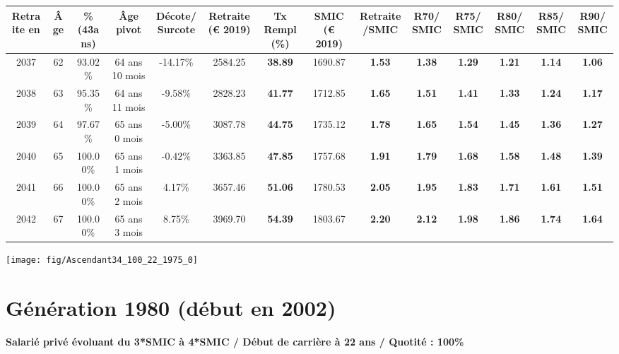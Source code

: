 \begin{adjustbox}{max width=\textwidth} 
\begin{tabular}[htb]{|c|c||c|c|c||c|c||c|c||c|c|c|c|c|} 
\hline 
 Retraite en &  Âge &  \%(43ans) &  Âge pivot &  Décote/Surcote &  Retraite (\euro{} 2019) &  Tx Rempl(\%) &  SMIC (\euro{} 2019) &  Retraite/SMIC &  R70/SMIC &  R75/SMIC &  R80/SMIC &  R85/SMIC &  R90/SMIC \\ 
\hline \hline 
 2037 &  62 &  93.02\% &  64 ans 10 mois &  -14.17\% &  2584.25 &  {\bf 38.89} &  1690.87 &  {\bf 1.53} &  {\bf 1.38} &  {\bf 1.29} &  {\bf 1.21} &  {\bf 1.14} &  {\bf 1.06} \\ 
\hline 
 2038 &  63 &  95.35\% &  64 ans 11 mois &  -9.58\% &  2828.23 &  {\bf 41.77} &  1712.85 &  {\bf 1.65} &  {\bf 1.51} &  {\bf 1.41} &  {\bf 1.33} &  {\bf 1.24} &  {\bf 1.17} \\ 
\hline 
 2039 &  64 &  97.67\% &  65 ans 0 mois &  -5.00\% &  3087.78 &  {\bf 44.75} &  1735.12 &  {\bf 1.78} &  {\bf 1.65} &  {\bf 1.54} &  {\bf 1.45} &  {\bf 1.36} &  {\bf 1.27} \\ 
\hline 
 2040 &  65 &  100.00\% &  65 ans 1 mois &  -0.42\% &  3363.85 &  {\bf 47.85} &  1757.68 &  {\bf 1.91} &  {\bf 1.79} &  {\bf 1.68} &  {\bf 1.58} &  {\bf 1.48} &  {\bf 1.39} \\ 
\hline 
 2041 &  66 &  100.00\% &  65 ans 2 mois &  4.17\% &  3657.46 &  {\bf 51.06} &  1780.53 &  {\bf 2.05} &  {\bf 1.95} &  {\bf 1.83} &  {\bf 1.71} &  {\bf 1.61} &  {\bf 1.51} \\ 
\hline 
 2042 &  67 &  100.00\% &  65 ans 3 mois &  8.75\% &  3969.70 &  {\bf 54.39} &  1803.67 &  {\bf 2.20} &  {\bf 2.12} &  {\bf 1.98} &  {\bf 1.86} &  {\bf 1.74} &  {\bf 1.64} \\ 
\hline 
\hline 
\end{tabular} 
\end{adjustbox} 
 
 \vspace{0.1cm} 

 {\hspace{-2.2cm}\texttt{[image: fig/Ascendant34\_100\_22\_1975\_0]}} 

\newpage 
 
\section{Génération 1980 (début en 2002)\label{Ascendant34_100_22_1980_0}} 
 
{\bf \noindent Salarié privé évoluant du 3*SMIC à 4*SMIC / Début de carrière à 22 ans / Quotité : 100\%}  ~ 

